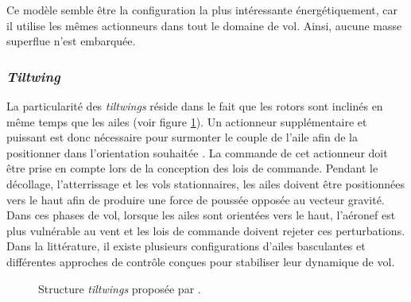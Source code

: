  
        Ce modèle semble être la configuration la plus intéressante énergétiquement, car il utilise les mêmes actionneurs dans tout le domaine de vol. Ainsi, aucune masse superflue n'est embarquée.

    
        \subsubsection*{\textit{Tiltwing}} 
        La particularité des \textit{tiltwings} réside dans le fait que les rotors sont inclinés en même temps que les ailes (voir figure \ref{fig:tiltwing}). Un actionneur supplémentaire et puissant est donc nécessaire pour surmonter le couple de l'aile afin de la positionner dans l'orientation souhaitée \cite{holsten2011design, rohr2019attitude, ccetinsoy2012design}. La commande de cet actionneur doit être prise en compte lors de la conception des lois de commande. Pendant le décollage, l'atterrissage et les vols stationnaires, les ailes doivent être positionnées vers le haut afin de produire une force de poussée opposée au vecteur gravité. Dans ces phases de vol, lorsque les ailes sont orientées vers le haut, l'aéronef est plus vulnérable au vent et les lois de commande doivent rejeter ces perturbations. Dans la littérature, il existe plusieurs configurations d'ailes basculantes et différentes approches de contrôle conçues pour stabiliser leur dynamique de vol.
        \begin{figure}[ht!]
            \centering
            \caption{Structure \textit{tiltwings}  proposée par \cite{Aero2_2024, Ostermann2012ControlCO}.}
            \label{fig:tiltwing}
        \end{figure}

